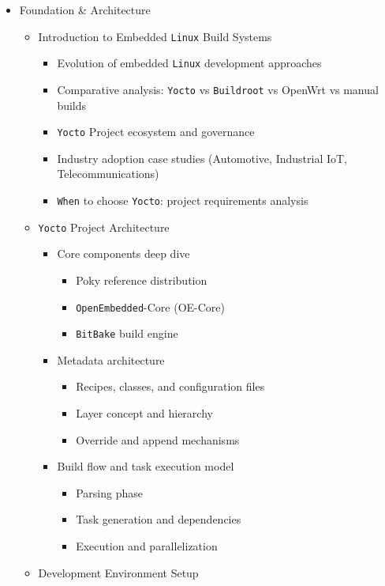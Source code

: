 \documentclass[
]{article}
\providecommand{\tightlist}{%
  \setlength{\itemsep}{0pt}\setlength{\parskip}{0pt}}
\begin{document}
\begin{itemize}
\tightlist
\item
  Foundation \& Architecture

  \begin{itemize}
  \tightlist
  \item
    Introduction to Embedded \texttt{Linux} Build Systems

    \begin{itemize}
    \tightlist
    \item
      Evolution of embedded \texttt{Linux} development approaches
    \item
      Comparative analysis: \texttt{Yocto} vs \texttt{Buildroot} vs
      OpenWrt vs manual builds
    \item
      \texttt{Yocto} Project ecosystem and governance
    \item
      Industry adoption case studies (Automotive, Industrial IoT,
      Telecommunications)
    \item
      \texttt{When} to choose \texttt{Yocto}: project requirements
      analysis
    \end{itemize}
  \item
    \texttt{Yocto} Project Architecture

    \begin{itemize}
    \tightlist
    \item
      Core components deep dive

      \begin{itemize}
      \tightlist
      \item
        Poky reference distribution
      \item
        \texttt{OpenEmbedded}-Core (OE-Core)
      \item
        \texttt{BitBake} build engine
      \end{itemize}
    \item
      Metadata architecture

      \begin{itemize}
      \tightlist
      \item
        Recipes, classes, and configuration files
      \item
        Layer concept and hierarchy
      \item
        Override and append mechanisms
      \end{itemize}
    \item
      Build flow and task execution model

      \begin{itemize}
      \tightlist
      \item
        Parsing phase
      \item
        Task generation and dependencies
      \item
        Execution and parallelization
      \end{itemize}
    \end{itemize}
  \item
    Development Environment Setup


\end{itemize}
\end{itemize}
\end{document}
